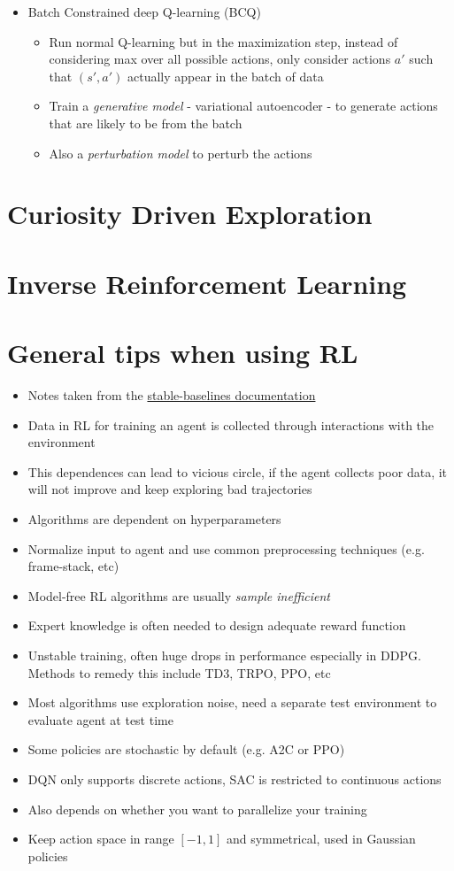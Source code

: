\documentclass[../main.tex]{subfiles}
\begin{document}
\begin{itemize}
    \item Batch Constrained deep Q-learning (BCQ) \cite{bcq}
    \begin{itemize}
      \item Run normal Q-learning but in the maximization step, instead of considering max over all possible actions, only consider actions $a'$ such that $(s',a')$ actually appear in the batch of data
      \item Train a \textit{generative model} - variational autoencoder - to generate actions that are likely to be from the batch
      \item Also a \textit{perturbation model} to perturb the actions
    \end{itemize}
  \end{itemize}

\section{Curiosity Driven Exploration}

\section{Inverse Reinforcement Learning}

\section{General tips when using RL}
\begin{itemize}
  \item Notes taken from the \href{https://stable-baselines.readthedocs.io/en/master/guide/rl_tips.html}{stable-baselines documentation}
  \item Data in RL for training an agent is collected through interactions with the environment
  \item This dependences can lead to vicious circle, if the agent collects poor data, it will not improve and keep exploring bad trajectories
  \item Algorithms are dependent on hyperparameters
  \item Normalize input to agent and use common preprocessing techniques (e.g. frame-stack, etc)
  \item Model-free RL algorithms are usually \textit{sample inefficient}
  \item Expert knowledge is often needed to design adequate reward function
  \item Unstable training, often huge drops in performance especially in DDPG. Methods to remedy this include TD3, TRPO, PPO, etc
  \item Most algorithms use exploration noise, need a separate test environment to evaluate agent at test time
  \item Some policies are stochastic by default (e.g. A2C or PPO)
  \item DQN only supports discrete actions, SAC is restricted to continuous actions
  \item Also depends on whether you want to parallelize your training
  \item Keep action space in range $[-1, 1]$ and symmetrical, used in Gaussian policies
\end{itemize}
\end{document}

